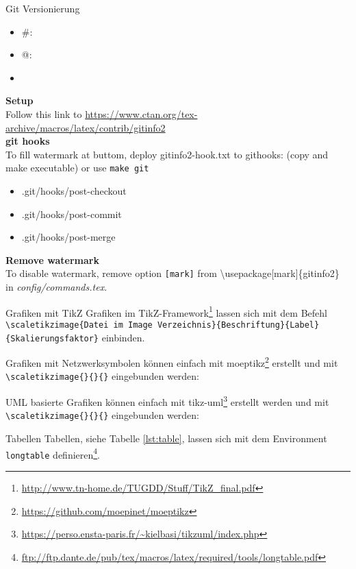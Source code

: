 \documentclass[a0paper,
landscape,
fontscale=0.332,
debug,
hyperref={pdfpagelabels=false}]{baposter}
\begin{document}
\begin{poster}
\begin{posterbox}[column=1, span=2,height=auto, name=posterboxTwo, boxpadding=1em]{Git Versionierung}
\begin{itemize}
\item \#: \gitAbbrevHash
\item @: \gitAuthorIsoDate
\item \gitReferences
\end{itemize}
\textbf{Setup}\\
Follow this link to \url{https://www.ctan.org/tex-archive/macros/latex/contrib/gitinfo2}\\
\textbf{git hooks}\\
  To fill watermark at buttom, deploy gitinfo2-hook.txt to githooks: (copy and make executable) or use \texttt{make git}
  \begin{itemize}
      \item .git/hooks/post-checkout
      \item .git/hooks/post-commit
      \item .git/hooks/post-merge
  \end{itemize}
  \textbf{Remove watermark}\\
  To disable watermark, remove option \texttt{[mark]} from \textbackslash usepackage[mark]\{gitinfo2\} in \textit{config/commands.tex}.
\end{posterbox}

\begin{posterbox}[column=0,span=2,below=auto,height=bottom, name=posterboxThree]{Grafiken mit TikZ}
Grafiken im TikZ-Framework\footnote{\url{http://www.tn-home.de/TUGDD/Stuff/TikZ_final.pdf}} lassen sich mit dem Befehl \lstinline|\scaletikzimage{Datei im Image Verzeichnis}{Beschriftung}{Label}{Skalierungsfaktor}| einbinden. 

Grafiken mit Netzwerksymbolen können einfach mit moeptikz\footnote{\url{https://github.com/moepinet/moeptikz}} erstellt und mit \lstinline|\scaletikzimage{}{}{}| eingebunden werden:

UML basierte Grafiken können einfach mit tikz-uml\footnote{\url{https://perso.ensta-paris.fr/~kielbasi/tikzuml/index.php}} erstellt werden und mit \lstinline|\scaletikzimage{}{}{}| eingebunden werden:
\end{posterbox}

\begin{posterbox}[column=2,below=posterboxTwo, height=auto, name=posterboxFour]{Tabellen}
Tabellen, siehe Tabelle \ref{lst:table}, lassen sich mit dem Environment \lstinline|longtable| definieren\footnote{\url{ftp://ftp.dante.de/pub/tex/macros/latex/required/tools/longtable.pdf}}.


\end{posterbox}
\end{poster}
\end{document}
